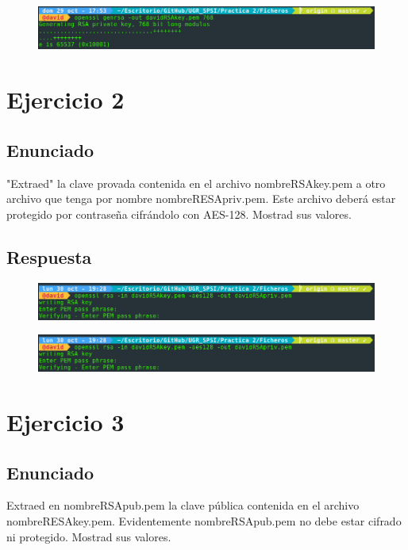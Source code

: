 \documentclass[10pt,a4paper,spanish]{report}
\begin{document}
\begin{figure}[!hbp]
 \centering  \includegraphics[width=1\textwidth]{./Imagenes/1.png}
\end{figure}


\chapter{Ejercicio 2}

\section{Enunciado}
\noindent
"Extraed" la clave provada contenida en el archivo nombreRSAkey.pem a otro archivo que tenga por nombre nombreRESApriv.pem. Este archivo deberá estar protegido por contraseña cifrándolo con AES-128. Mostrad sus valores.

\section{Respuesta}
\noindent

\begin{figure}[!hbp]
 \centering  \includegraphics[width=1\textwidth]{./Imagenes/2.png}
\end{figure}

\begin{figure}[!hbp]
 \centering  \includegraphics[width=1\textwidth]{./Imagenes/2.png}
\end{figure}

\chapter{Ejercicio 3}

\section{Enunciado}
\noindent
Extraed en nombreRSApub.pem la clave pública contenida en el archivo nombreRESAkey.pem. Evidentemente nombreRSApub.pem no debe estar cifrado ni protegido. Mostrad sus valores.
\end{document}
